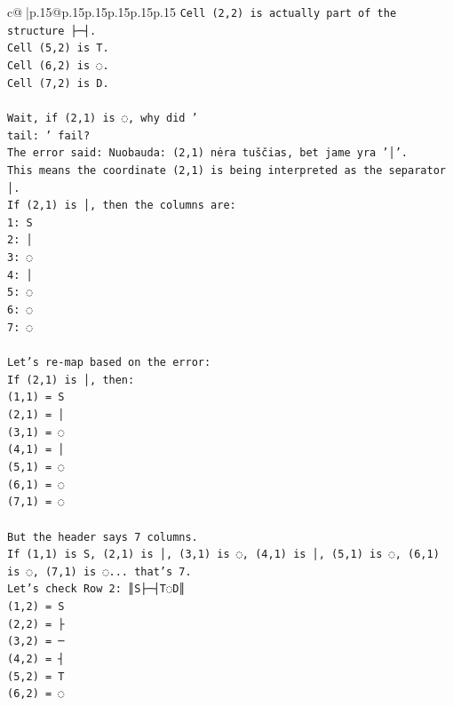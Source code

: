 \documentclass{article}
\begin{document}
{\begin{supertabular}{c@{$\;$}|p{.15\linewidth}@{}p{.15\linewidth}p{.15\linewidth}p{.15\linewidth}p{.15\linewidth}p{.15\linewidth}}
{{{\texttt{Cell (2,2) is actually part of the structure ├─┤.} \\
\texttt{Cell (5,2) is T.} \\
\texttt{Cell (6,2) is ◌.} \\
\texttt{Cell (7,2) is D.} \\
\\ 
\texttt{Wait, if (2,1) is ◌, why did '} \\
\texttt{tail: ' fail?} \\
\texttt{The error said: Nuobauda: (2,1) nėra tuščias, bet jame yra '│'.} \\
\texttt{This means the coordinate (2,1) is being interpreted as the separator │.} \\
\texttt{If (2,1) is │, then the columns are:} \\
\texttt{1: S} \\
\texttt{2: │} \\
\texttt{3: ◌} \\
\texttt{4: │} \\
\texttt{5: ◌} \\
\texttt{6: ◌} \\
\texttt{7: ◌} \\
\\ 
\texttt{Let's re{-}map based on the error:} \\
\texttt{If (2,1) is │, then:} \\
\texttt{(1,1) = S} \\
\texttt{(2,1) = │} \\
\texttt{(3,1) = ◌} \\
\texttt{(4,1) = │} \\
\texttt{(5,1) = ◌} \\
\texttt{(6,1) = ◌} \\
\texttt{(7,1) = ◌} \\
\\ 
\texttt{But the header says 7 columns.} \\
\texttt{If (1,1) is S, (2,1) is │, (3,1) is ◌, (4,1) is │, (5,1) is ◌, (6,1) is ◌, (7,1) is ◌... that's 7.} \\
\texttt{Let's check Row 2: ║S├─┤T◌D║} \\
\texttt{(1,2) = S} \\
\texttt{(2,2) = ├} \\
\texttt{(3,2) = ─} \\
\texttt{(4,2) = ┤} \\
\texttt{(5,2) = T} \\
\texttt{(6,2) = ◌} \\
}}}
\end{supertabular}}
\end{document}
